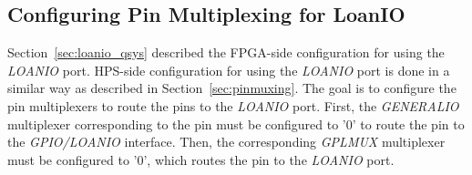 \documentclass[11pt, twoside, pdftex]{article}
\newcommand{\commonPath}{../../Common}
\begin{document}
\subsection{Configuring Pin Multiplexing for LoanIO}

Section~\ref{sec:loanio_qsys} described the FPGA-side configuration for using the \textit{LOANIO} port. HPS-side configuration for using the \textit{LOANIO} port is done in a similar way as described in Section~\ref{sec:pinmuxing}. The goal is to configure the pin multiplexers to route the pins to the \textit{LOANIO} port. First, the \textit{GENERALIO} multiplexer corresponding to the pin must be configured to '0' to route the pin to the \textit{GPIO/LOANIO} interface. Then, the corresponding \textit{GPLMUX} multiplexer must be configured to '0', which routes the pin to the \textit{LOANIO} port. 





\clearpage

\vspace{1in}


\end{document}

